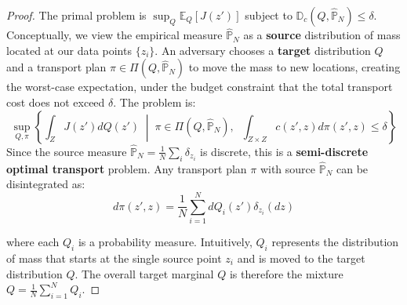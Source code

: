\documentclass[12pt]{report}
\begin{document}
\begin{proof}

The primal problem is $\sup_{Q} \mathbb{E}_Q[J(z')]$ subject to $\mathbb{D}_c(Q, \hat{\mathbb{P}}_N) \le \delta$. Conceptually, we view the empirical measure $\hat{\mathbb{P}}_N$ as a \textbf{source} distribution of mass located at our data points $\{z_i\}$. An adversary chooses a \textbf{target} distribution $Q$ and a transport plan $\pi \in \Pi(Q, \hat{\mathbb{P}}_N)$ to move the mass to new locations, creating the worst-case expectation, under the budget constraint that the total transport cost does not exceed $\delta$. The problem is:
\[
\sup_{Q, \pi} \left\{ \int_{Z} J(z') dQ(z') \;\middle|\; \pi \in \Pi(Q, \hat{\mathbb{P}}_N), \;\; \int_{Z \times Z} c(z', z) d\pi(z', z) \le \delta \right\}
\]
Since the source measure $\hat{\mathbb{P}}_N = \frac{1}{N}\sum_i \delta_{z_i}$ is discrete, this is a \textbf{semi-discrete optimal transport} problem. Any transport plan $\pi$ with source $\hat{\mathbb{P}}_N$ can be disintegrated as:
\[
d\pi(z', z) = \frac{1}{N}\sum_{i=1}^N dQ_i(z') \delta_{z_i}(dz)
\]

where each $Q_i$ is a probability measure. Intuitively, $Q_i$ represents the distribution of mass that starts at the single source point $z_i$ and is moved to the target distribution $Q$. The overall target marginal $Q$ is therefore the mixture $Q = \frac{1}{N}\sum_{i=1}^N Q_i$.


\end{proof}
\end{document}
